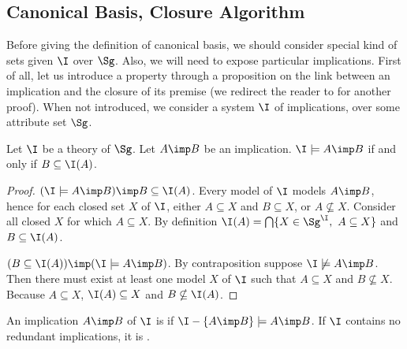 
\subsection{Canonical Basis, Closure Algorithm}

Before giving the definition of canonical basis, we should consider special 
kind of sets given $\I$ over $\Sg$. Also, we will need to expose particular
implications. First of all, let us introduce a property through a proposition
on the link between an implication and the closure of its premise (we redirect the reader to \cite{b._ganter_conceptual_2016} for another proof). When not introduced, we consider a system $\I$ of implications, over some attribute set $\Sg$.

\begin{proposition} Let $\I$ be a theory of $\Sg$. Let $A \imp B$ be an implication. $\I \models A \imp B$ if and only if $B \subseteq \I(A)$.	
\end{proposition}

\begin{proof} $(\I \models A \imp B) \imp B \subseteq \I(A)$. Every model
of $\I$ models $A \imp B$, hence for each closed set $X$ of $\I$, either 
$A \subseteq X $ and $B \subseteq X$, or $A \nsubseteq X$. Consider all closed 
$X$ for which $A \subseteq X$. By definition $\I(A) = \bigcap \{X \in 
\Sg^{\I},\  A \subseteq X \}$ and $B \subseteq \I(A)$.

\vspace{1.2em}

$(B \subseteq \I(A)) \imp (\I \models A \imp B)$. By contraposition suppose 
$\I \not\models A \imp B$. Then there must exist at least one model $X$ of $\I$
such that $A \subseteq X$ and $B \nsubseteq X$. Because $A \subseteq X$, 
$\I(A) \subseteq X$ and $B \nsubseteq \I(A)$.
	
\end{proof}

\begin{definition} An implication $A \imp B$ of $\I$ is 
 if $\I - \{A \imp B \} \models A \imp B$. If $\I$ 
contains no redundant implications, it is .
	
\end{definition}

